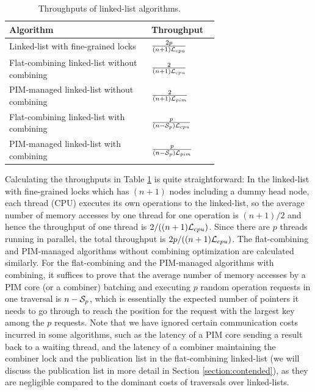 \begin{table}[ht!]
\begin{center}
	\begin{tabular}{| m{0.68\linewidth}  | l |}    
    \hline
    Algorithm & Throughput\\ \hline
    Linked-list with fine-grained locks & ${2p \over (n+1)\mathcal{L}_{cpu}}$ \\ \hline
    Flat-combining linked-list without combining & ${2 \over (n+1)\mathcal{L}_{cpu}}$ \\ \hline
    PIM-managed linked-list without combining & ${2 \over (n+1)\mathcal{L}_{pim}}$ \\ \hline
    Flat-combining linked-list with combining & ${p \over (n-\mathcal{S}_{p})\mathcal{L}_{cpu}}$ \\ \hline
    PIM-managed linked-list with combining & ${p \over (n-\mathcal{S}_{p})\mathcal{L}_{pim}}$ \\ \hline
    \end{tabular}
\end{center}
\caption{Throughputs of linked-list algorithms.}
\label{tab:linkedlist}
\end{table}

Calculating the throughputs in Table \ref{tab:linkedlist} is quite straightforward: 
In the linked-list with fine-grained locks which has $(n+1)$ nodes including 
a dummy head node, each thread (CPU) executes its own operations to the linked-list, 
so the average number of memory accesses by one thread for one operation is $(n+1)/2$ 
and hence the throughput of one thread is $2/((n+1)\mathcal{L}_{cpu})$. 
Since there are $p$ threads running in parallel, the total throughput is $2p/((n+1)\mathcal{L}_{cpu})$. 
The flat-combining and PIM-managed algorithms without combining optimization are calculated similarly. 
For the flat-combining and the PIM-managed algorithms with combining, it suffices to prove that
the average number of memory accesses by a PIM core (or a combiner) batching and executing 
$p$ random operation requests in one traversal is $n - \mathcal{S}_{p}$, 
which is essentially the expected number of pointers it needs to go through to reach the position 
for the request with the largest key among the $p$ requests. 
Note that we have ignored certain communication costs incurred in some algorithms, 
such as the latency of a PIM core sending a result back to a waiting thread, 
and the latency of a combiner maintaining the combiner lock and the publication list in the flat-combining 
linked-list (we will discuss the publication list in more detail in Section \ref{section:contended}), 
as they are negligible compared to the dominant costs of traversals over linked-lists.
 
